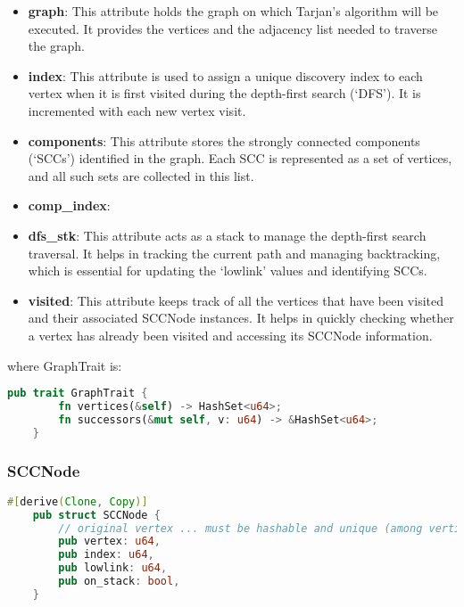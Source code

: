 \begin{itemize}
    \item \textbf{graph}: This attribute holds the graph on which Tarjan's algorithm will be executed.
    It provides the vertices and the adjacency list needed to traverse the graph.
    \item \textbf{index}: This attribute is used to assign a unique discovery index to each vertex when it is first visited during the depth-first search (`DFS').
    It is incremented with each new vertex visit.
    \item \textbf{components}: This attribute stores the strongly connected components (`SCCs') identified in the graph.
    Each SCC is represented as a set of vertices, and all such sets are collected in this list.
    \item \textbf{comp\_index}:
    \item \textbf{dfs\_stk}: This attribute acts as a stack to manage the depth-first search traversal.
    It helps in tracking the current path and managing backtracking, which is essential for updating the `lowlink' values and identifying SCCs.
    \item \textbf{visited}: This attribute keeps track of all the vertices that have been visited and their associated SCCNode instances.
    It helps in quickly checking whether a vertex has already been visited and accessing its SCCNode information.
\end{itemize}

where GraphTrait is:

\begin{lstlisting}[language=Rust, style=rust, caption={Defining GraphTrait}, label={lst:rust-define-graphtrait}, firstnumber=1]
    pub trait GraphTrait {
        fn vertices(&self) -> HashSet<u64>;
        fn successors(&mut self, v: u64) -> &HashSet<u64>;
    }
\end{lstlisting}

\subsubsection{SCCNode}

\begin{lstlisting}[language=Rust, style=rust, caption={Defining the SCCNode with Rust}, label={lst:rust-define-sccnode}, firstnumber=1]
    #[derive(Clone, Copy)]
    pub struct SCCNode {
        // original vertex ... must be hashable and unique (among vertices)
        pub vertex: u64,
        pub index: u64,
        pub lowlink: u64,
        pub on_stack: bool,
    }
\end{lstlisting}

